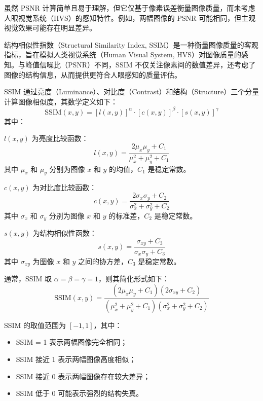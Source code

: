 虽然 PSNR 计算简单且易于理解，但它仅基于像素误差衡量图像质量，而未考虑人眼视觉系统（HVS）的感知特性。例如，两幅图像的 PSNR 可能相同，但主观视觉效果可能存在明显差异。

结构相似性指数（Structural Similarity Index, SSIM）是一种衡量图像质量的客观指标，旨在模拟人类视觉系统（Human Visual System, HVS）对图像质量的感知。与峰值信噪比（PSNR）不同，SSIM 不仅关注像素间的数值差异，还考虑了图像的结构信息，从而提供更符合人眼感知的质量评估。

SSIM 通过亮度（Luminance）、对比度（Contrast）和结构（Structure）三个分量计算图像相似度，其数学定义如下：
\begin{equation}
\text{SSIM}(x, y) = [l(x, y)]^\alpha \cdot [c(x, y)]^\beta \cdot [s(x, y)]^\gamma
\end{equation}
其中：

$l(x, y)$ 为亮度比较函数：
\begin{equation}
l(x, y) = \frac{2\mu_x\mu_y + C_1}{\mu_x^2 + \mu_y^2 + C_1}
\end{equation}
其中 $\mu_x$ 和 $\mu_y$ 分别为图像 $x$ 和 $y$ 的均值，$C_1$ 是稳定常数。

$c(x, y)$ 为对比度比较函数：
\begin{equation}
c(x, y) = \frac{2\sigma_x\sigma_y + C_2}{\sigma_x^2 + \sigma_y^2 + C_2}
\end{equation}
其中 $\sigma_x$ 和 $\sigma_y$ 分别为图像 $x$ 和 $y$ 的标准差，$C_2$ 是稳定常数。

$s(x, y)$ 为结构相似性函数：
\begin{equation}
s(x, y) = \frac{\sigma_{xy} + C_3}{\sigma_x \sigma_y + C_3}
\end{equation}
其中 $\sigma_{xy}$ 为图像 $x$ 和 $y$ 之间的协方差，$C_3$ 是稳定常数。


通常，SSIM 取 $\alpha = \beta = \gamma = 1$，则其简化形式如下：
\begin{equation}
    \text{SSIM}(x, y) = \frac{(2\mu_x\mu_y + C_1)(2\sigma_{xy} + C_2)}{(\mu_x^2 + \mu_y^2 + C_1)(\sigma_x^2 + \sigma_y^2 + C_2)}
\end{equation}

SSIM 的取值范围为 $[-1,1]$，其中：
\begin{itemize}
    \item SSIM = 1 表示两幅图像完全相同；
    \item SSIM 接近 1 表示两幅图像高度相似；
    \item SSIM 接近 0 表示两幅图像存在较大差异；
    \item SSIM 低于 0 可能表示强烈的结构失真。
\end{itemize}

